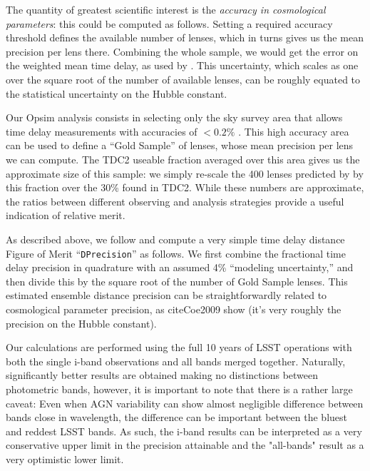 The quantity of greatest scientific interest is the {\it accuracy in
	cosmological parameters}: this could be computed as follows. Setting a
required accuracy threshold  defines the available number of lenses,
which in turns gives us the mean precision per lens there. Combining the
whole sample, we would get the error on the weighted mean time delay, as
used by \cite{Coe2009}. This uncertainty, which scales as one
over the square root of the number of available lenses,  can be roughly
equated to the statistical uncertainty on the Hubble constant.

Our Opsim analysis consists in selecting only the sky survey area that allows time delay measurements with accuracies of $<0.2\%$ \citep{Hojjati2014}. This high accuracy area can be used
to define a ``Gold Sample'' of lenses, whose mean precision per lens we
can compute. The TDC2 useable fraction averaged over this area gives us
the approximate size of this sample: we simply re-scale the 400 lenses
predicted by \cite{Liao2015} by this fraction over the 30\% found
in TDC2. While these numbers are approximate, the ratios between
different observing and analysis strategies provide a useful indication of relative merit.

As described above, we follow \cite{Coe2009} and compute a
very simple time delay distance Figure of Merit ``\texttt{DPrecision}''
as follows. We first combine the fractional time delay precision in
quadrature with an assumed 4\% ``modeling uncertainty,'' and then divide
this by the square root of the number of Gold Sample lenses. This
estimated ensemble distance precision can be straightforwardly related
to cosmological parameter precision, as cite{Coe2009} show
(it's very roughly the precision on the Hubble constant).

Our calculations are performed using the full 10 years of LSST operations with both the single i-band observations and all bands merged together. Naturally, significantly better results are obtained making no distinctions between photometric bands, however, it is important to note that there is a rather large caveat: Even when AGN variability can show almost negligible difference between bands close in wavelength, the difference can be important between the bluest and reddest LSST bands. As such, the i-band results can be interpreted as a very conservative upper limit in the precision attainable and the "all-bands" result as a very optimistic lower limit.

